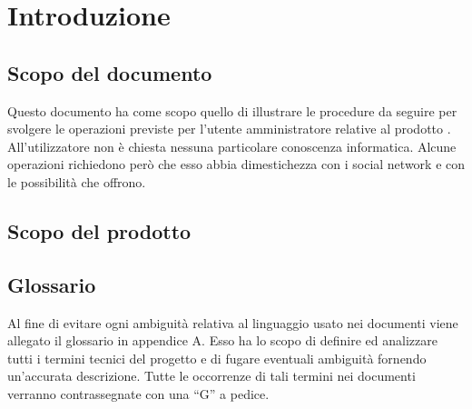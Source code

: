 %


\section{Introduzione} %
\label{sec:introduzione}

	\subsection{Scopo del documento} %
	\label{sub:scopo_del_documento}
		Questo documento ha come scopo quello di illustrare le procedure da seguire per svolgere le operazioni previste per l'utente amministratore relative al prodotto \projectName. All'utilizzatore non è chiesta nessuna particolare conoscenza informatica. Alcune operazioni richiedono però che esso abbia dimestichezza con i social network e con le possibilità che offrono.

	\subsection{Scopo del prodotto} %
	\label{sub:scopo_del_prodotto}
		\productScope

	\subsection{Glossario} %
	\label{sub:glossario}
		Al fine di evitare ogni ambiguità relativa al linguaggio usato nei documenti viene allegato il glossario in appendice A.\newline
		Esso ha lo scopo di definire ed analizzare tutti i termini tecnici del progetto e di fugare eventuali ambiguità fornendo un'accurata descrizione.\newline
		Tutte le occorrenze di tali termini nei documenti verranno contrassegnate con una ``G'' a pedice.

